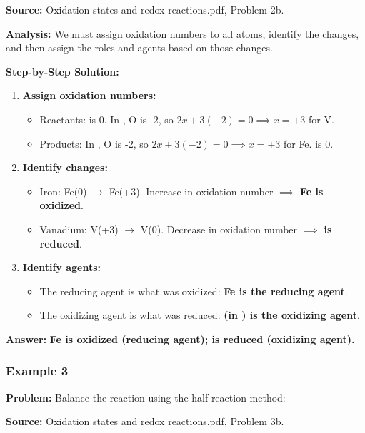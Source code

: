 \documentclass{article}
\begin{document}
\textbf{Source:} Oxidation states and redox reactions.pdf, Problem 2b.

\textbf{Analysis:} We must assign oxidation numbers to all atoms, identify the changes, and then assign the roles and agents based on those changes.

\textbf{Step-by-Step Solution:}
\begin{enumerate}
    \item \textbf{Assign oxidation numbers:}
        \begin{itemize}
            \item Reactants:  is 0. In , O is -2, so $2x + 3(-2) = 0 \implies x = +3$ for V.
            \item Products: In , O is -2, so $2x + 3(-2) = 0 \implies x = +3$ for Fe.  is 0.
        \end{itemize}
    \item \textbf{Identify changes:}
        \begin{itemize}
            \item Iron: Fe(0) $\rightarrow$ Fe(+3). Increase in oxidation number $\implies$ \textbf{Fe is oxidized}.
            \item Vanadium: V(+3) $\rightarrow$ V(0). Decrease in oxidation number $\implies$ \textbf{ is reduced}.
        \end{itemize}
    \item \textbf{Identify agents:}
        \begin{itemize}
            \item The reducing agent is what was oxidized: \textbf{Fe is the reducing agent}.
            \item The oxidizing agent is what was reduced: \textbf{ (in ) is the oxidizing agent}.
        \end{itemize}
\end{enumerate}

\textbf{Answer:} \textbf{Fe is oxidized (reducing agent);  is reduced (oxidizing agent).}

\subsubsection{Example 3}
\textbf{Problem:} Balance the reaction using the half-reaction method: 

\textbf{Source:} Oxidation states and redox reactions.pdf, Problem 3b.
\end{document}
